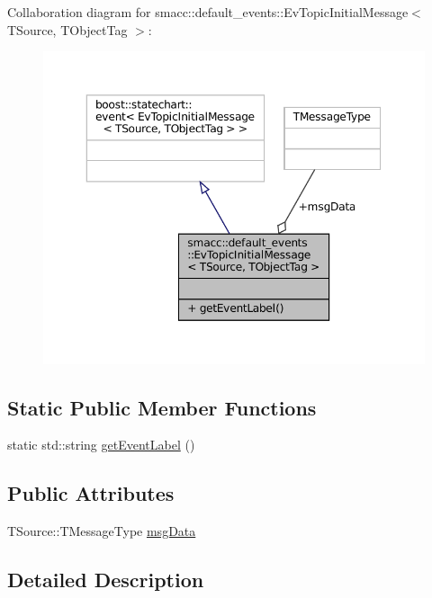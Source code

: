 Collaboration diagram for smacc\+:\+:default\+\_\+events\+:\+:Ev\+Topic\+Initial\+Message$<$ T\+Source, T\+Object\+Tag $>$\+:
\nopagebreak
\begin{figure}[H]
\begin{center}
\leavevmode
\includegraphics[width=350pt]{structsmacc_1_1default__events_1_1EvTopicInitialMessage__coll__graph}
\end{center}
\end{figure}
\subsection*{Static Public Member Functions}
\begin{DoxyCompactItemize}
\item 
static std\+::string \hyperlink{structsmacc_1_1default__events_1_1EvTopicInitialMessage_a7532e8ca89792c94c46074076e59d265}{get\+Event\+Label} ()
\end{DoxyCompactItemize}
\subsection*{Public Attributes}
\begin{DoxyCompactItemize}
\item 
T\+Source\+::\+T\+Message\+Type \hyperlink{structsmacc_1_1default__events_1_1EvTopicInitialMessage_a989c7cf4210c7750806b081bc73112cd}{msg\+Data}
\end{DoxyCompactItemize}


\subsection{Detailed Description}
